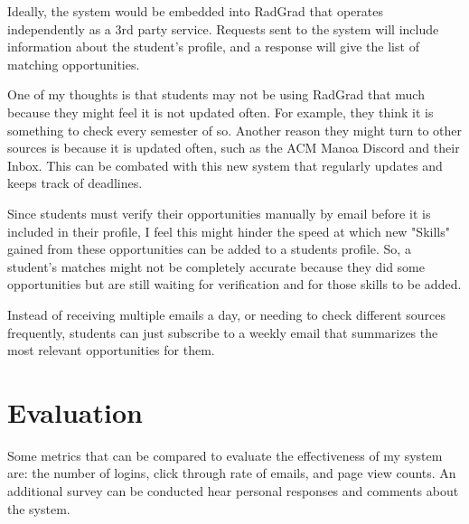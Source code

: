 \documentclass[english]{proposalnsf}
\begin{document}
Ideally, the system would be embedded into RadGrad that operates independently as a 3rd party service. Requests sent to the system will include information about the student's profile, and a response will give the list of matching opportunities. 

One of my thoughts is that students may not be using RadGrad that much because they might feel it is not updated often. For example, they think it is something to check every semester of so. Another reason they might turn to other sources is because it is updated often, such as the ACM Manoa Discord and their Inbox. This can be combated with this new system that regularly updates and keeps track of deadlines. 

Since students must verify their opportunities manually by email before it is included in their profile, I feel this might hinder the speed at which new "Skills" gained from these opportunities can be added to a students profile. So, a student's matches might not be completely accurate because they did some opportunities but are still waiting for verification and for those skills to be added. 

Instead of receiving multiple emails a day, or needing to check different sources frequently, students can just subscribe to a weekly email that summarizes the most relevant opportunities for them.

	
	\section{Evaluation}
	\label{evaluation}
	Some metrics that can be compared to evaluate the effectiveness of my system are: the number of logins, click through rate of emails, and page view counts. An additional survey can be conducted hear personal responses and comments about the system.
	
	
\end{document}
